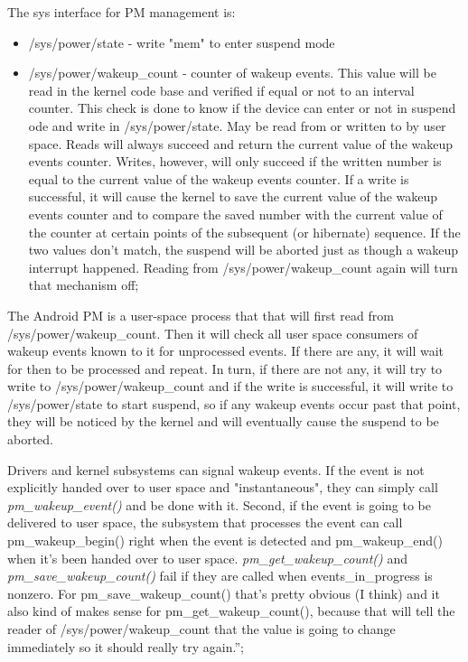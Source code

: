 The sys interface for PM management is:
\begin{itemize}
  \item /sys/power/state - write "mem" to enter suspend mode
  \item /sys/power/wakeup_count - counter of wakeup events. This value will be read in the kernel code base and verified if equal or not to an interval counter. This check is done to know if the device can enter or not in suspend ode and write in /sys/power/state. May be read from or written to by user space. Reads will always succeed and return the current value of the wakeup events counter. Writes, however, will only succeed if the written number is equal to the current value of the wakeup events counter. If a write is successful, it will cause the kernel to save the current value of the wakeup events counter and to compare the saved number with the current value of the counter at certain points of the subsequent (or hibernate) sequence. If the two values don't match, the suspend will be aborted just as though a wakeup interrupt happened. Reading from /sys/power/wakeup_count again will turn that mechanism off;
\end{itemize}

The Android PM is a user-space process that that will first read from /sys/power/wakeup_count. Then it will check all user space consumers of wakeup events known to it for unprocessed events. If there are any, it will wait for then to be processed and repeat. In turn, if there are not any, it will try to write to /sys/power/wakeup_count and if the write is successful, it will write to /sys/power/state to start suspend, so if any wakeup events occur past that point, they will be noticed by the kernel and will eventually cause the suspend to be aborted.

Drivers and kernel subsystems can signal wakeup events. If the event is not explicitly handed over to user space and "instantaneous", they can simply call \textit{pm_wakeup_event()} and be done with it. Second, if the event is going to be delivered to user space, the subsystem that processes the event can call pm_wakeup_begin() right when the event is detected and pm_wakeup_end() when it's been handed over to user space. \textit{pm_get_wakeup_count()} and \textit{pm_save_wakeup_count()} fail if they are called when events_in_progress is nonzero. For pm_save_wakeup_count() that's pretty obvious (I think) and it also kind of makes sense for pm_get_wakeup_count(), because that will tell the reader of /sys/power/wakeup_count that the value is going to change immediately so it should really try again.”;

